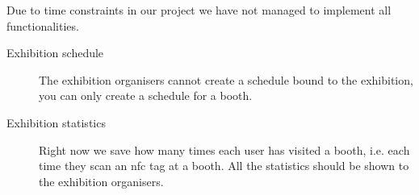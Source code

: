 Due to time constraints in our project we have not managed to implement all functionalities. 

\begin{description}
\item[Exhibition schedule] The exhibition organisers cannot create a schedule bound to the exhibition, you can only create a schedule for a booth.%
\item[Exhibition statistics] Right now we save how many times each user has visited a booth, i.e. each time they scan an \ac{nfc} tag at a booth. All the statistics should be shown to the exhibition organisers.


\end{description}

